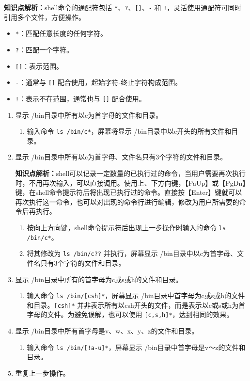 \textbf{知识点解析：}shell命令的通配符包括 \verb|*|、\verb|?|、\verb|[]|、\verb|-| 和 \verb|!|，灵活使用通配符可同时引用多个文件，方便操作。
\begin{itemize}
  \item \verb|*|：匹配任意长度的任何字符。
  \item \verb|?|：匹配一个字符。
  \item \verb|[]|：表示范围。
  \item \verb|-|：通常与 \verb|[]| 配合使用，起始字符-终止字符构成范围。
  \item \verb|!|：表示不在范围，通常也与 \verb|[]| 配合使用。
\end{itemize}
\begin{enumerate}
  \item 显示 /bin目录中所有以c为首字母的文件和目录。
    \begin{enumerate}
      \item 输入命令 \verb|ls /bin/c*|，屏幕将显示 /bin目录中以c开头的所有文件和目录。
    \end{enumerate}
  \item 显示 /bin目录中所有以c为首字母、文件名只有3个字符的文件和目录。

    \textbf{知识点解析：}shell可以记录一定数量的已执行过的命令，当用户需要再次执行时，不用再次输入，可以直接调用。使用上、下方向键，【PaUp】或【PgDn】键，在shell命令提示符后将出现已执行过的命令。直接按【Enter】键就可以再次执行这一命令，也可以对出现的命令行进行编辑，修改为用户所需要的命令后再执行。
    \begin{enumerate}
      \item 按向上方向键，shell命令提示符后出现上一步操作时输入的命令 \verb|ls /bin/c*|。
      \item 将其修改为 \verb|ls /bin/c??| 并执行，屏幕显示 /bin目录中以c为首字母、文件名只有3个字符的文件和目录。
    \end{enumerate}
  \item 显示 /bin目录中所有的首字母为c或s或h的文件和目录。
    \begin{enumerate}
      \item 输入命令 \verb|ls /bin/[csh]*|，屏幕显示 /bin目录中首字母为c或s或h的文件和目录。\verb|[csh]*| 并非表示所有以csh开头的文件，而是表示以c或s或h为首字母的文件。为避免误解，也可以使用 \verb|[c,s,h]*|，达到相同的效果。
    \end{enumerate}
  \item 显示 /bin目录中所有首字母是v、w、x、y、z的文件和目录。
    \begin{enumerate}
      \item 输入命令 \verb|ls /bin/[!a-u]*|，屏幕显示 /bin目录中首字母是v～z的文件和目录。
    \end{enumerate}
  \item 重复上一步操作。
    

\end{enumerate}

